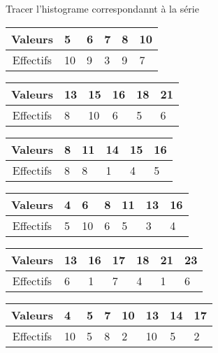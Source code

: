  Tracer l'histograme correspondannt à la série

\begin{multicols}{2}

\begin{center}
\begin{tabular}{c*{5}{|p{0.5cm}}}
 Valeurs  & 5 & 6 & 7 & 8 & 10\\ \hline 
 Effectifs  & 10 & 9 & 3 & 9 & 7
\end{tabular}
\end{center}


\begin{center}
\begin{tabular}{c*{5}{|p{0.5cm}}}
 Valeurs  & 13 & 15 & 16 & 18 & 21\\ \hline 
 Effectifs  & 8 & 10 & 6 & 5 & 6
\end{tabular}
\end{center}


\begin{center}
\begin{tabular}{c*{5}{|p{0.5cm}}}
 Valeurs  & 8 & 11 & 14 & 15 & 16\\ \hline 
 Effectifs  & 8 & 8 & 1 & 4 & 5
\end{tabular}
\end{center}


\begin{center}
\begin{tabular}{c*{6}{|p{0.5cm}}}
 Valeurs  & 4 & 6 & 8 & 11 & 13 & 16\\ \hline 
 Effectifs  & 5 & 10 & 6 & 5 & 3 & 4
\end{tabular}
\end{center}


\begin{center}
\begin{tabular}{c*{6}{|p{0.5cm}}}
 Valeurs  & 13 & 16 & 17 & 18 & 21 & 23\\ \hline 
 Effectifs  & 6 & 1 & 7 & 4 & 1 & 6
\end{tabular}
\end{center}


\begin{center}
\begin{tabular}{c*{7}{|p{0.5cm}}}
 Valeurs  & 4 & 5 & 7 & 10 & 13 & 14 & 17\\ \hline 
 Effectifs  & 10 & 5 & 8 & 2 & 10 & 5 & 2
\end{tabular}
\end{center}

\end{multicols}